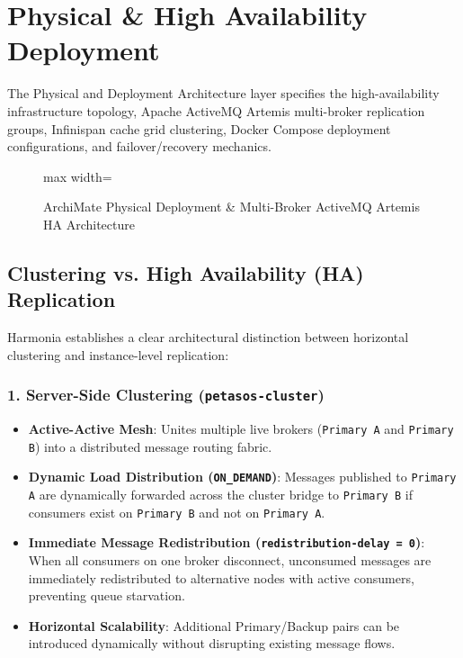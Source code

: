 
\chapter{Physical \& High Availability Deployment}
\label{chap:deployment_ha}

The Physical and Deployment Architecture layer specifies the high-availability infrastructure topology, Apache ActiveMQ Artemis multi-broker replication groups, Infinispan cache grid clustering, Docker Compose deployment configurations, and failover/recovery mechanics.

\begin{figure}[htbp]
    \centering
    \begin{adjustbox}{max width=\textwidth}
        
    \end{adjustbox}
    \caption{ArchiMate Physical Deployment \& Multi-Broker ActiveMQ Artemis HA Architecture}
    \label{fig:deployment_ha}
\end{figure}

\section{Clustering vs. High Availability (HA) Replication}

Harmonia establishes a clear architectural distinction between horizontal clustering and instance-level replication:

\subsection{1. Server-Side Clustering (\texttt{petasos-cluster})}
\begin{itemize}
    \item \textbf{Active-Active Mesh}: Unites multiple live brokers (\texttt{Primary A} and \texttt{Primary B}) into a distributed message routing fabric.
    \item \textbf{Dynamic Load Distribution (\texttt{ON\_DEMAND})}: Messages published to \texttt{Primary A} are dynamically forwarded across the cluster bridge to \texttt{Primary B} if consumers exist on \texttt{Primary B} and not on \texttt{Primary A}.
    \item \textbf{Immediate Message Redistribution (\texttt{redistribution-delay = 0})}: When all consumers on one broker disconnect, unconsumed messages are immediately redistributed to alternative nodes with active consumers, preventing queue starvation.
    \item \textbf{Horizontal Scalability}: Additional Primary/Backup pairs can be introduced dynamically without disrupting existing message flows.
\end{itemize}

